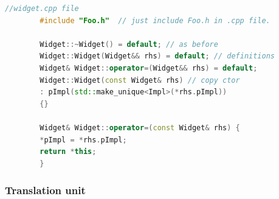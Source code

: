 \documentclass[a4paper,12pt,twoside]{book}
\begin{document}
\begin{itemize}
\begin{enumerate}
\begin{lstlisting}[frame=single, language=c++, mathescape=true]
		//widget.cpp file
		#include "Foo.h"  // just include Foo.h in .cpp file.
		
		Widget::~Widget() = default; // as before
		Widget::Widget(Widget&& rhs) = default; // definitions
		Widget& Widget::operator=(Widget&& rhs) = default;
		Widget::Widget(const Widget& rhs) // copy ctor
		: pImpl(std::make_unique<Impl>(*rhs.pImpl))
		{}
		
		Widget& Widget::operator=(const Widget& rhs) {
		*pImpl = *rhs.pImpl;
		return *this;
		}
		\end{lstlisting}
		
	\end{enumerate}
	
	
\end{itemize}



\subsubsection{Translation unit}
\end{document}
